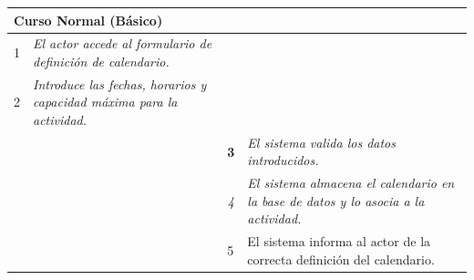     \begin{table}[H]
        \begin{tabular}{llllllll}
    \hline
    \multicolumn{8}{|l|}{\cellcolor[HTML]{F2F2F2}Curso Normal (Básico)}                                                                                                                                                                                                                                                                          \\ \hline
    \multicolumn{1}{|c|}{1}  & \multicolumn{1}{l|}{{\color[HTML]{808080} \textit{El actor accede al formulario de definición de calendario.}}} & \multicolumn{1}{l|}{{\color[HTML]{808080} }}                    & \multicolumn{5}{l|}{{\color[HTML]{808080} }}                                                                                            \\ \hline
    \multicolumn{1}{|c|}{2}   & \multicolumn{1}{p{6cm}|}{{\color[HTML]{808080} \textit{Introduce las fechas, horarios y capacidad máxima para la actividad.}}}                                                 & \multicolumn{1}{c|}{} & \multicolumn{5}{p{6cm}|}{{\color[HTML]{808080} \textit{}}}                         \\ \hline
    \multicolumn{1}{|l|}{}   & \multicolumn{1}{l|}{{\color[HTML]{808080} }}                                                          & \multicolumn{1}{l|}{{\color[HTML]{808080} \textbf{3}}}          & \multicolumn{5}{p{6cm}|}{{\color[HTML]{808080} \textit{El sistema valida los datos introducidos.}}} \\ \hline
    \multicolumn{1}{|l|}{}   & \multicolumn{1}{l|}{{\color[HTML]{808080} }}                                                          & \multicolumn{1}{c|}{{\color[HTML]{808080} \textit{4}}}          & \multicolumn{5}{p{6cm}|}{{\color[HTML]{808080} \textit{El sistema almacena el calendario en la base de datos y lo asocia a la actividad.}}}                   \\ \hline
    \multicolumn{1}{|l|}{}   & \multicolumn{1}{l|}{{\color[HTML]{808080} }}                                                          & \multicolumn{1}{l|}{{\color[HTML]{808080} 5}}                   & \multicolumn{5}{p{6cm}|}{{\color[HTML]{808080} El sistema informa al actor de la correcta definición del calendario.}}                                  \\ \hline
    \end{tabular}
    \end{table}

